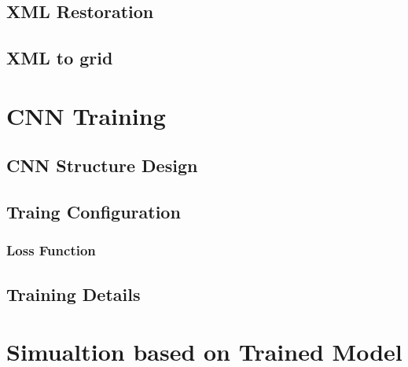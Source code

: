 \subsection{XML Restoration}
\subsection{XML to grid}


\section{CNN Training}

\subsection{CNN  Structure Design}

\subsection{Traing Configuration}
\subsubsection{Loss Function}

\subsection{Training Details}

\section{Simualtion based on Trained Model}
